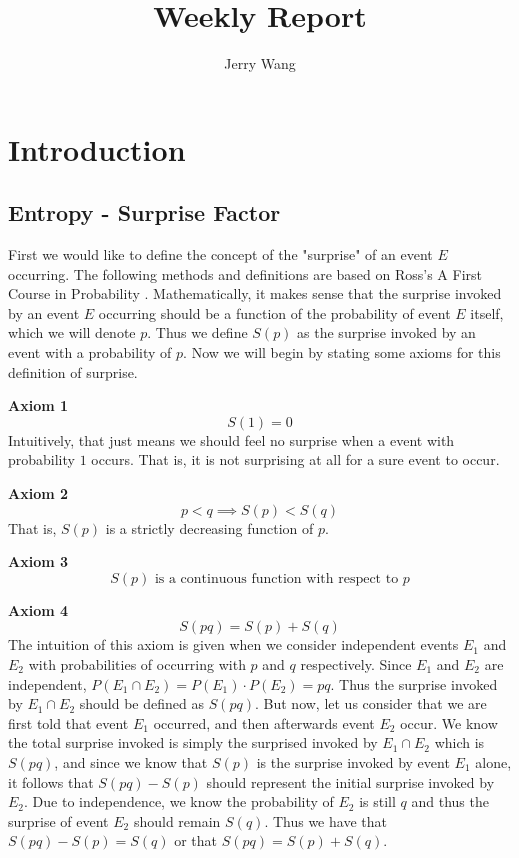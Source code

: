 \documentclass{article}
\title{Weekly Report}
\author{Jerry Wang}
\date{ }
\begin{document}
\maketitle

\tableofcontents
\newpage
\section{Introduction}
\subsection{Entropy - Surprise Factor}
First we would like to define the concept of the "surprise" of an event $E$ occurring. The following methods and definitions are based on Ross's A First Course in Probability \cite{b1}. Mathematically, it makes sense that the surprise invoked by an event $E$ occurring should be a function of the probability of event $E$ itself, which we will denote $p$.
Thus we define $S(p)$ as the surprise invoked by an event with a probability of $p$. 
Now we will begin by stating some axioms for this definition of surprise.

\textbf{Axiom 1}
\[S(1) = 0\]
Intuitively, that just means we should feel no surprise when a event with probability $1$ occurs. That is, it is not surprising at all for a sure event to occur.

\textbf{Axiom 2}
\[
p<q \implies S(p)<S(q)
\]
That is, $S(p)$ is a strictly decreasing function of $p$.

\textbf{Axiom 3}
\[
S(p) \text{ is a continuous function with respect to $p$}
\]

\textbf{Axiom 4}
\[
S(pq) =S(p)+S(q)
\]
The intuition of this axiom is given when we consider independent events $E_1$ and $E_2$ with probabilities of occurring with $p$ and $q$ respectively. 
Since $E_1$ and $E_2$ are independent, $P(E_1 \cap E_2) = P(E_1)\cdot P(E_2) = pq$. 
Thus the surprise invoked by $E_1 \cap E_2$ should be defined as $S(pq)$. 
But now, let us consider that we are first told that event $E_1$ occurred, and then afterwards event $E_2$ occur. 
We know the total surprise invoked is simply the surprised invoked by $E_1 \cap E_2$ which is $S(pq)$, and since we know that $S(p)$ is the surprise invoked by event $E_1$ alone, it follows that $S(pq) - S(p)$ should represent the initial surprise invoked by $E_2$. 
Due to independence, we know the probability of $E_2$ is still $q$ and thus the surprise of event $E_2$ should remain $S(q)$. 
Thus we have that $S(pq) - S(p) = S(q)$ or that $S(pq) =S(p)+S(q)$. 
\end{document}
